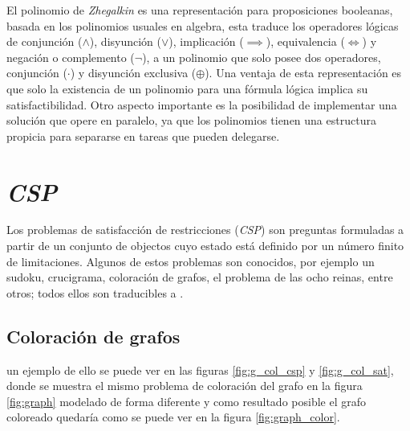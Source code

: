 El polinomio de \textit{Zhegalkin}\cite{zhegalkin} es una representación para proposiciones booleanas, basada en los polinomios usuales en algebra, esta traduce los operadores lógicas de conjunción ($\land$), disyunción ($\lor$), implicación ($\implies$), equivalencia ($\iff$) y negación o complemento ($\neg$), a un polinomio que solo posee dos operadores, conjunción ($\cdot$) y disyunción exclusiva ($\oplus$). Una ventaja de esta representación es que solo la existencia de un polinomio para una fórmula lógica implica su satisfactibilidad. Otro aspecto importante es la posibilidad de implementar una solución que opere en paralelo, ya que los polinomios tienen una estructura propicia para separarse en tareas que pueden delegarse.

\section{\textit{CSP}}

Los problemas de satisfacción de restricciones (\textit{CSP}) son preguntas formuladas a partir de un conjunto de objectos cuyo estado está definido por un número finito de limitaciones. Algunos de estos problemas son conocidos, por ejemplo un sudoku, crucigrama, coloración de grafos, el problema de las ocho reinas, entre otros; todos ellos son traducibles a \sat.


\subsection{Coloración de grafos}

un ejemplo de ello se puede ver en las figuras \ref{fig:g_col_csp} y \ref{fig:g_col_sat}, donde se muestra el mismo problema de coloración del grafo en la figura \ref{fig:graph} modelado de forma diferente y como resultado posible el grafo coloreado quedaría como se puede ver en la figura \ref{fig:graph_color}.


